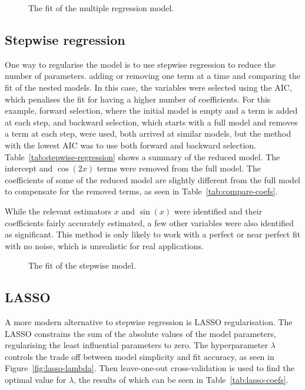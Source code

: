 \begin{figure}[htbp]
	\centering
	
	\caption{The fit of the multiple regression model.}
	\label{fig:multiple-regression-fit}
\end{figure}

\subsection{Stepwise regression}

One way to regularise the model is to use stepwise regression to reduce the number of parameters.
 adding or removing one term at a time and comparing the fit of the nested models.
In this case, the variables were selected using the \ac{AIC}, which penalises the fit for having a higher number of coefficients.
For this example, forward selection, where the initial model is empty and a term is added at each step, and backward selection, which starts with a full model and removes a term at each step, were used, both arrived at similar models, but the method with the lowest \ac{AIC} was to use both forward and backward selection.
Table~\ref{tab:stepwise-regression} shows a summary of the reduced model.
The intercept and \(\cos(2x)\) terms were removed from the full model.
The coefficients of some of the reduced model are slightly different from the full model to compensate for the removed terms, as seen in Table~\ref{tab:compare-coefs}.

While the relevant estimators \(x\) and \(\sin(x)\) were identified and their coefficients fairly accurately estimated, a few other variables were also identified as significant.
This method is only likely to work with a perfect or near perfect fit with no noise, which is unrealistic for real applications.

\begin{figure}[htbp]
	\centering
	
	\caption{The fit of the stepwise model.}
	\label{fig:stepwise-regression-fit}
\end{figure}

\subsection{LASSO}

A more modern alternative to stepwise regression is \ac{LASSO} regularisation.
The \ac{LASSO} constrains the sum of the absolute values of the model parameters, regularising the least influential parameters to zero.
The hyperparameter \(\lambda\) controls the trade off between model simplicity and fit accuracy, as seen in Figure~\ref{fig:lasso-lambda}.
Then leave-one-out cross-validation is used to find the optimal value for \(\lambda\), the results of which can be seen in Table~\ref{tab:lasso-coefs}.

